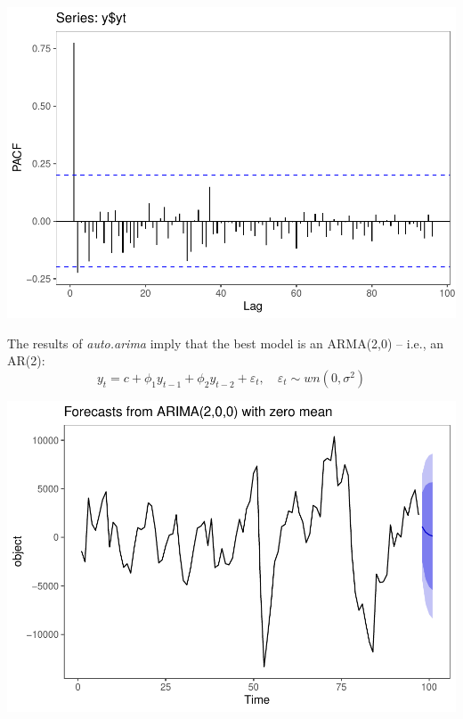 \documentclass[]{article}
\newenvironment{Shaded}{\begin{snugshade}}{\end{snugshade}}
\newcommand{\DataTypeTok}[1]{\textcolor[rgb]{0.13,0.29,0.53}{#1}}
\newcommand{\DecValTok}[1]{\textcolor[rgb]{0.00,0.00,0.81}{#1}}
\newcommand{\KeywordTok}[1]{\textcolor[rgb]{0.13,0.29,0.53}{\textbf{#1}}}
\newcommand{\NormalTok}[1]{#1}
\newcommand{\OperatorTok}[1]{\textcolor[rgb]{0.81,0.36,0.00}{\textbf{#1}}}
\newcommand{\StringTok}[1]{\textcolor[rgb]{0.31,0.60,0.02}{#1}}
\begin{document}
\includegraphics{Econo2_P5_files/figure-latex/plots fac facp-4.pdf}

The results of \emph{auto.arima} imply that the best model is an
ARMA(2,0) -- i.e., an AR(2):
\[ y_t = c + \phi_1 y_{t-1} + \phi_2 y_{t-2} + \varepsilon_t, \hspace{1em} \varepsilon_t \sim wn(0, \sigma^2)\]

\begin{Shaded}
\end{Shaded}

\includegraphics{Econo2_P5_files/figure-latex/forecast plot-1.pdf}
\end{document}
